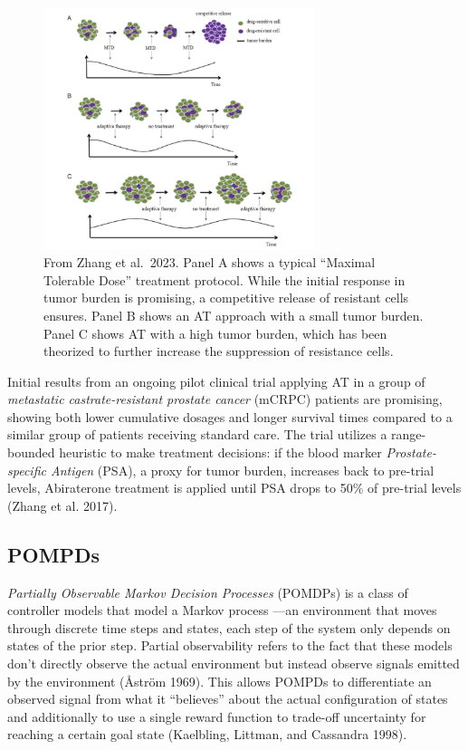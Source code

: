 \documentclass[
]{article}
\begin{document}
\begin{figure}
\centering
\includegraphics[width=3.125in,height=\textheight]{images/Screenshot 2024-05-20 at 08.15.19.png}
\caption{From Zhang et al.~2023. Panel A shows a typical ``Maximal
Tolerable Dose'' treatment protocol. While the initial response in tumor
burden is promising, a competitive release of resistant cells ensures.
Panel B shows an AT approach with a small tumor burden. Panel C shows AT
with a high tumor burden, which has been theorized to further increase
the suppression of resistance cells.}
\end{figure}

Initial results from an ongoing pilot clinical trial applying AT in a
group of \emph{metastatic castrate-resistant prostate cancer} (mCRPC)
patients are promising, showing both lower cumulative dosages and longer
survival times compared to a similar group of patients receiving
standard care. The trial utilizes a range-bounded heuristic to make
treatment decisions: if the blood marker \emph{Prostate-specific
Antigen} (PSA), a proxy for tumor burden, increases back to pre-trial
levels, Abiraterone treatment is applied until PSA drops to 50\% of
pre-trial levels (Zhang et al. 2017).

\subsection{POMPDs}\label{pompds}

\emph{Partially Observable Markov Decision Processes} (POMDPs) is a
class of controller models that model a Markov process ---an environment
that moves through discrete time steps and states, each step of the
system only depends on states of the prior step. Partial observability
refers to the fact that these models don't directly observe the actual
environment but instead observe signals emitted by the environment
(Åström 1969). This allows POMPDs to differentiate an observed signal
from what it ``believes'' about the actual configuration of states and
additionally to use a single reward function to trade-off uncertainty
for reaching a certain goal state (Kaelbling, Littman, and Cassandra
1998).
\end{document}
